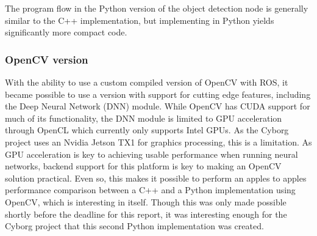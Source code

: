 \documentclass[\rootfolder/main.tex]{subfiles}
\begin{document}
The program flow in the Python version of the object detection node is generally similar to the C++ implementation, but implementing in Python yields significantly more compact code.

\subsubsection{OpenCV version}

With the ability to use a custom compiled version of OpenCV with ROS, it became possible to use a version with support for cutting edge features, including the Deep Neural Network (DNN) module.
While OpenCV has CUDA support for much of its functionality, the DNN module is limited to GPU acceleration through OpenCL which currently only supports Intel GPUs.
As the Cyborg project uses an Nvidia Jetson TX1 for graphics processing, this is a limitation.
As GPU acceleration is key to achieving usable performance when running neural networks, backend support for this platform is key to making an OpenCV solution practical.
Even so, this makes it possible to perform an apples to apples performance comparison between a C++ and a Python implementation using OpenCV, which is interesting in itself.
Though this was only made possible shortly before the deadline for this report, it was interesting enough for the Cyborg project that this second Python implementation was created.
\end{document}
